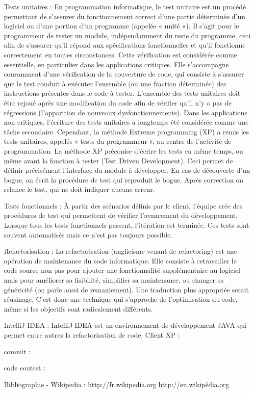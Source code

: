Tests unitaires : En programmation informatique, le test unitaire est un procédé permettant de s'assurer du fonctionnement correct d'une partie déterminée d'un logiciel ou d'une portion d'un programme (appelée « unité »).
Il s'agit pour le programmeur de tester un module, indépendamment du reste du programme, ceci afin de s'assurer qu'il répond aux spécifications fonctionnelles et qu'il fonctionne correctement en toutes circonstances. Cette vérification est considérée comme essentielle, en particulier dans les applications critiques. Elle s'accompagne couramment d'une vérification de la couverture de code, qui consiste à s'assurer que le test conduit à exécuter l'ensemble (ou une fraction déterminée) des instructions présentes dans le code à tester.
L'ensemble des tests unitaires doit être rejoué après une modification du code afin de vérifier qu'il n'y a pas de régressions (l'apparition de nouveaux dysfonctionnements).
Dans les applications non critiques, l'écriture des tests unitaires a longtemps été considérée comme une tâche secondaire. Cependant, la méthode Extreme programming (XP) a remis les tests unitaires, appelés « tests du programmeur », au centre de l'activité de programmation.
La méthode XP préconise d'écrire les tests en même temps, ou même avant la fonction à tester (Test Driven Development). Ceci permet de définir précisément l'interface du module à développer. En cas de découverte d'un bogue, on écrit la procédure de test qui reproduit le bogue. Après correction on relance le test, qui ne doit indiquer aucune erreur.

Tests fonctionnels : À partir des scénarios définis par le client, l'équipe crée des procédures de test qui permettent de vérifier l'avancement du développement. Lorsque tous les tests fonctionnels passent, l'itération est terminée. Ces tests sont souvent automatisés mais ce n'est pas toujours possible. 

Refactorisation : La refactorisation (anglicisme venant de refactoring) est une opération de maintenance du code informatique. Elle consiste à retravailler le code source non pas pour ajouter une fonctionnalité supplémentaire au logiciel mais pour améliorer sa lisibilité, simplifier sa maintenance, ou changer sa généricité (on parle aussi de remaniement). Une traduction plus appropriée serait réusinage. C'est donc une technique qui s'approche de l'optimisation du code, même si les objectifs sont radicalement différents. 

IntelliJ IDEA : IntelliJ IDEA est un environnement de développement JAVA qui permet entre autres la refactorisation de code.
Client XP : 

commit : 

code contest :



Bibliographie
- Wikipedia : 
http://fr.wikipedia.org
http://en.wikipédia.org

